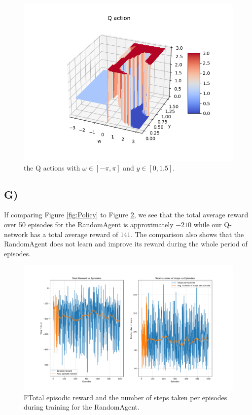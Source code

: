\documentclass{article}
\begin{document}
\begin{figure}[H]
    \centering
    \includegraphics[width=1\textwidth]{Lab_2/problem1/images/Q_action.png}
    \caption{\small the Q actions with $\omega \in [-\pi,\pi] $ and $y \in [0, 1.5]$.}
    \label{fig:Q_action}
\end{figure}

\subsection*{G)}
If comparing Figure \ref{fig:Policy} to Figure \ref{fig:randomAgent}, we see that the total average reward over 50 episodes for the RandomAgent is approximately $-210$ while our Q-network has a total average reward of $141$. The comparison also shows that the RandomAgent does not learn and improve its reward during the whole period of episodes.
\begin{figure}[H]
    \centering
    \includegraphics[width=1\textwidth]{Lab_2/problem1/images/randomAgent.png}
    \caption{\small FTotal episodic reward and the number of steps taken per episodes during training for the RandomAgent.  }
    \label{fig:randomAgent}
\end{figure}
\end{document}
